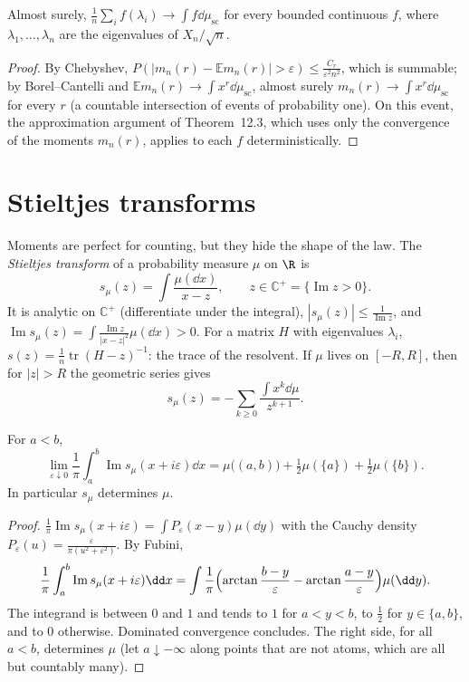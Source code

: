 \begin{theorem}\label{thm:wigneras}
Almost surely, $\frac1n\sum_if(\lambda_i)\to\int f\dd\mu_{\mathrm{sc}}$ for every bounded continuous $f$, where $\lambda_1,\dots,\lambda_n$ are the eigenvalues of $X_n/\sqrt n$.
\end{theorem}

\begin{proof}
By Chebyshev, $P(|m_n(r)-\mathbb Em_n(r)|>\varepsilon)\le\frac{C_r}{\varepsilon^2n^2}$, which is summable; by Borel--Cantelli and $\mathbb Em_n(r)\to\int x^r\dd\mu_{\mathrm{sc}}$, almost surely $m_n(r)\to\int x^r\dd\mu_{\mathrm{sc}}$ for every $r$ (a
countable intersection of events of probability one). On this event, the approximation argument of Theorem~12.3, which uses only the convergence of the moments $m_n(r)$, applies to each $f$ deterministically.
\end{proof}

\section{Stieltjes transforms}

Moments are perfect for counting, but they hide the shape of the law. The \emph{Stieltjes transform} of a probability measure $\mu$ on $\R$ is
\[
s_\mu(z)=\int\frac{\mu(\dd x)}{x-z},\qquad z\in\mathbb C^+=\{\operatorname{Im}z>0\}.
\]
It is analytic on $\mathbb C^+$ (differentiate under the integral), $|s_\mu(z)|\le\frac1{\operatorname{Im}z}$, and $\operatorname{Im}s_\mu(z)=\int\frac{\operatorname{Im}z}{|x-z|^2}\mu(\dd x)>0$. For a matrix $H$ with eigenvalues $\lambda_i$,
$s(z)=\frac1n\operatorname{tr}(H-z)^{-1}$: the trace of the resolvent. If $\mu$ lives on $[-R,R]$, then for $|z|>R$ the geometric series gives
\begin{equation}\label{eq:stieltjesmoments}
s_\mu(z)=-\sum_{k\ge0}\frac{\int x^k\dd\mu}{z^{k+1}}.
\end{equation}

\begin{proposition}\label{prop:inversion}
For $a<b$,
\[
\lim_{\varepsilon\downarrow0}\frac1\pi\int_a^b\operatorname{Im}s_\mu(x+i\varepsilon)\dd x=\mu\bigl((a,b)\bigr)+\tfrac12\mu(\{a\})+\tfrac12\mu(\{b\}).
\]
In particular $s_\mu$ determines $\mu$.
\end{proposition}

\begin{proof}
$\frac1\pi\operatorname{Im}s_\mu(x+i\varepsilon)=\int P_\varepsilon(x-y)\mu(\dd y)$ with the Cauchy density $P_\varepsilon(u)=\frac{\varepsilon}{\pi(u^2+\varepsilon^2)}$. By Fubini,
\[
\frac1\pi\int_a^b\operatorname{Im}s_\mu(x+i\varepsilon)\dd x=\int\frac1\pi\Bigl(\arctan\frac{b-y}\varepsilon-\arctan\frac{a-y}\varepsilon\Bigr)\mu(\dd y).
\]
The integrand is between $0$ and $1$ and tends to $1$ for $a<y<b$, to $\frac12$ for $y\in\{a,b\}$, and to $0$ otherwise. Dominated convergence concludes. The right side, for all $a<b$, determines $\mu$ (let $a\downarrow-\infty$
along points that are not atoms, which are all but countably many).
\end{proof}

